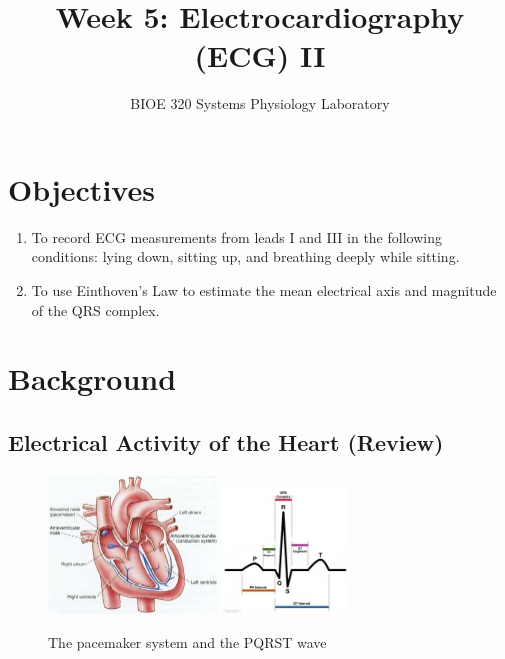 \documentclass{article}
\title{Week 5: Electrocardiography (ECG) II}
\author{BIOE 320 Systems Physiology Laboratory}
\date{}
\begin{document}
\large
\maketitle

\section*{Objectives}
\begin{enumerate}
	\item To record ECG measurements from leads I and III in the following conditions: lying down, sitting up, and breathing deeply while sitting.
	\item To use Einthoven's Law to estimate the mean electrical axis and magnitude of the QRS complex.
\end{enumerate}

\section*{Background}


\subsection*{Electrical Activity of the Heart (Review)}
\begin{figure}[h]
\centering\includegraphics[width=0.4\textwidth]{../images/ECG_II_1a.jpg}
\centering\includegraphics[width=0.3\textwidth]{../images/ECG_II_1b.jpg}
\caption{The pacemaker system and the PQRST wave}
\label{pacemaker}
\end{figure}
\end{document}
